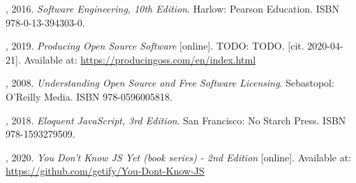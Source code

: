\documentclass[thesismargins, english, thesislinespacing, twoside, openright, upjsfrontpage]{rnthesis}
\begin{document}
\begin{thebibliography}{9}
  , 2016. \emph{Software Engineering, 10th Edition}. Harlow: Pearson Education. ISBN 978-0-13-394303-0.

  , 2019. \emph{Producing Open Source Software} [online]. TODO: TODO. [cit. 2020-04-21]. Available at: \url{https://producingoss.com/en/index.html}

  , 2008. \emph{Understanding Open Source and Free Software Licensing}. Sebastopol: O’Reilly Media. ISBN 978-0596005818.

  , 2018. \emph{Eloquent JavaScript, 3rd Edition}. San Francisco: No Starch Press. ISBN 978-1593279509.

  , 2020. \emph{You Don't Know JS Yet (book series) - 2nd Edition} [online]. Available at: \url{https://github.com/getify/You-Dont-Know-JS}


\end{thebibliography}
\end{document}
